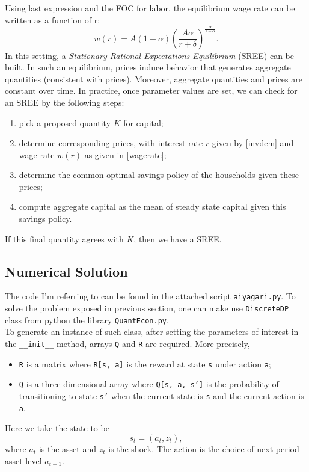 \documentclass[12pt]{article}
\begin{document}
Using last expression and the FOC for labor, the equilibrium wage rate can be written as a function of r:
\begin{equation}
\label{wagerate}
w(r) = A(1 - \alpha)\left(\frac{A\alpha}{r + \delta} \right)^{\frac{\alpha}{1- \alpha}}.
\end{equation}
In this setting, a \textit{Stationary Rational Expectations Equilibrium} (SREE) can be built. In such an equilibrium, prices induce behavior that generates aggregate quantities (consistent with prices). Moreover, aggregate quantities and prices are constant over time. In practice, once parameter values are set, we can check for an SREE by the following steps:
\begin{enumerate}
\item pick a proposed quantity $K$ for capital;
\item determine corresponding prices, with interest rate $r$ given by \ref{invdem} and wage rate $w(r)$ as given in \ref{wagerate};
\item determine the common optimal savings policy of the households given these prices;
\item compute aggregate capital as the mean of steady state capital given this savings policy.
\end{enumerate}
If this final quantity agrees with $K$, then we have a SREE.
\subsection{Numerical Solution}
The code I'm referring to can be found in the attached script \texttt{aiyagari.py}.
To solve the problem exposed in previous section, one can make use \texttt{DiscreteDP} class from python the library \texttt{QuantEcon.py}. \\
To generate an instance of such class, after setting the parameters of interest in the \texttt{\_\_init\_\_} method, arrays \texttt{Q} and \texttt{R} are required. More precisely,
\begin{itemize}
\item \texttt{R} is a matrix where \texttt{R[s, a]} is the reward at state \texttt{s} under action \texttt{a};
\item \texttt{Q} is a three-dimensional array where \texttt{Q[s, a, s']} is the probability of transitioning to state \texttt{s'} when the current state is \texttt{s} and the current action is \texttt{a}.
\end{itemize}
Here we take the state to be 
\begin{equation}
s_t = \left(a_t, z_t\right),
\end{equation}
where $a_t$ is the asset and $z_t$ is the shock. The action is the choice of next period asset level $a_{t+1}$.
\end{document}
